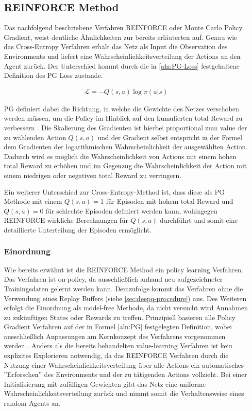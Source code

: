 \documentclass[11pt]{scrartcl}
\begin{document}
\subsection{REINFORCE Method}
Das nachfolgend beschriebene Verfahren REINFORCE oder Monte Carlo Policy Gradient, weist
deutliche Ähnlichkeiten zur bereits erläuterten  auf.
Genau wie das Cross-Entropy Verfahren erhält das Netz als Input die Observation des
Environments und liefert eine Wahrscheinlichkeitsverteilung der Actions an den Agent
zurück. Der Unterschied kommt durch die in \autoref{aln:PG-Loss} festgehaltene Definition
des PG Loss zustande.

\begin{align}
\mathcal{L}=-Q(s,a)\log\pi(a|s)
\label{aln:PG-Loss}
\end{align}

PG definiert dabei die Richtung, in welche die Gewichte des Netzes verschoben werden müssen,
um die Policy im Hinblick auf den kumulierten total Reward zu verbessern \cite[~S.244]{L2018}.
Die Skalierung des Gradienten ist hierbei proportional zum value der zu wählenden Action
$Q(s,a)$ und der Gradient selbst entspricht in der Formel dem Gradienten der logarithmischen
Wahrscheinlichkeit der ausgewählten Action. Dadurch wird es möglich die Wahrscheinlichkeit
von Actions mit einem hohen total Reward zu erhöhen und im Gegenzug die Wahrscheinlichkeit
der Action mit einem niedrigen oder negativen total Reward zu verringern.

Ein weiterer Unterschied zur Cross-Entropy-Method ist, dass diese als PG Methode mit einem
$Q(s,a)=1$ für Episoden mit hohem total Reward und $Q(s,a)=0$ für schlechte Episoden
definiert werden kann, wohingegen REINFORCE wirkliche Berechnungen für $Q(s,a)$ durchführt
und somit eine detaillierte Unterteilung der Episoden ermöglicht.

\subsubsection{Einordnung}
Wie bereits erwähnt ist die REINFORCE Method ein policy learning Verfahren. Das Verfahren ist
on-policy, da ausschließlich anhand neu aufgezeichneter Trainingsdaten gelernt werden kann.
Demzufolge kommt das Verfahren ohne die Verwendung eines Replay Buffers (siehe 
\autoref{sec:deepq-procedure}) aus. Des Weiteren erfolgt die Einordnung als model-free Methode,
da nicht versucht wird Annahmen zu zukünftigen States oder Rewards zu treffen. Prinzipiell
basieren alle Policy Gradient Verfahren auf der in Formel \ref{aln:PG} festgelegten Definition,
wobei ausschließlich Anpassungen am Kernkonzept des Verfahrens vorgenommen werden
\cite[~S.244 f.]{L2018}. Anders als die bereits behandelten value-learning Verfahren ist
kein explizites Explorieren notwendig, da das REINFORCE Verfahren durch die Nutzung einer
Wahrscheinlichkeitsverteilung über alle Actions ein automatisches ''Erforschen'' 
des Environments und der zu tätigenden Actions vollzieht. Bei einer Initialisierung mit
zufälligen Gewichten gibt das Netz eine uniforme Wahrscheinlichkeitsverteilung zurück und nimmt
somit die Verhaltensweise eines random Agents an.
\end{document}
